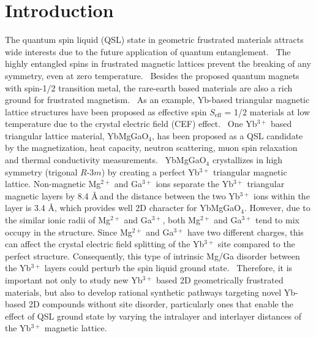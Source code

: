 \documentclass[%
 aip,
 amsmath,amssymb,
 reprint,%
]{revtex4-1}
\begin{document}
\maketitle

\section{\label{sec:level1}Introduction}

The quantum spin liquid (QSL) state in geometric frustrated materials attracts wide interests due to the future application of quantum entanglement.~\cite{sadoc_mosseri_1999,Moessner} The highly entangled spins in frustrated magnetic lattices prevent the breaking of any symmetry, even at zero temperature.~\cite{Anderson,Mila2000,Balents} Besides the proposed quantum magnets with spin-1/2 transition metal, the rare-earth based materials are also a rich ground for frustrated magnetism.~\cite{RevModPhys,Broholmeaay0668,li2020spin,sarkis2020unravelling,pajerowski2020quantification,rau2018frustration,xingYbCl3} As an example, Yb-based triangular magnetic lattice structures have been proposed as effective spin $S_{\mathrm{eff}}$ = 1/2 materials at low temperature due to the crystal electric field (CEF) effect.~\cite{Wu1,Wu2,agrapidis,Hester,lispinon,lieffect,lianisotropic} One Yb$^{3+}$ based triangular lattice material, YbMgGaO$_4$, has been proposed as a QSL candidate by the magnetization, heat capacity, neutron scattering, muon spin relaxation and thermal conductivity measurements.~\cite{li2015gapless,li2015rare,li2016muon,shen2016evidence,paddison2017continuous,zhang2018hierarchy,li2017crystalline,steinhardt2019field,li2019ybmggao4} YbMgGaO$_4$ crystallizes in high symmetry (trigonal $R$-3$m$) by creating a perfect Yb$^{3+}$ triangular magnetic lattice. Non-magnetic Mg$^{2+}$ and Ga$^{3+}$ ions separate the Yb$^{3+}$ triangular magnetic layers by 8.4 \AA$~$and the distance between the two Yb$^{3+}$ ions within the layer is 3.4 \AA, which provides well 2D character for YbMgGaO$_4$. However, due to the similar ionic radii of Mg$^{2+}$ and Ga$^{3+}$, both Mg$^{2+}$ and Ga$^{3+}$ tend to mix occupy in the structure. Since Mg$^{2+}$ and Ga$^{3+}$ have two different charges, this can affect the crystal electric field splitting of the Yb$^{3+}$ site compared to the perfect structure. Consequently, this type of intrinsic Mg/Ga disorder between the Yb$^{3+}$ layers could perturb the spin liquid ground state.~\cite{li2015gapless,paddison2017continuous,zhang2018hierarchy,shen2018fractionalized,zhu2017disorder,zhu2018topography,kimchi2018valence} Therefore, it is important not only to study new Yb$^{3+}$ based 2D geometrically frustrated materials, but also to develop rational synthetic pathways targeting novel Yb-based 2D compounds without site disorder, particularly ones that enable the effect of QSL ground state by varying the intralayer and interlayer distances of the Yb$^{3+}$ magnetic lattice.
\end{document}
